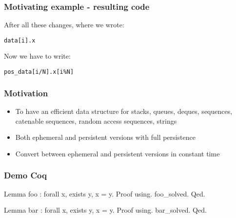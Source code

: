 \begin{frame}[fragile]
\frametitle{Motivating example - resulting code}

After all these changes, where we wrote:

\begin{lstlisting}[style=Cstyle]
  data[i].x 
\end{lstlisting}

\bigskip

Now we have to write:

\begin{lstlisting}[style=Cstyle]
  pos_data[i/N].x[i%N]
\end{lstlisting}

\end{frame}

\begin{frame}[fragile]
\frametitle{Motivation}

\begin{itemize}
	\setlength\itemsep{1.5em}
	\item To have an efficient data structure for stacks, queues, deques, sequences, catenable sequences, random access sequences, strings\\
	\item Both ephemeral and persistent versions with full persistence\\
	\item Convert between ephemeral and persistent versions in constant time
\end{itemize}

\end{frame}


\begin{frame}[fragile]
\frametitle{Demo Coq}

\begin{coq}
  Lemma foo : forall x, exists y, x = y.
  Proof using.
    foo_solved.
  Qed.
\end{coq}

\begin{coqs}
  Lemma bar : forall x, exists y, x = y.
  Proof using.
    bar_solved.
  Qed.
\end{coqs}

\end{frame}


